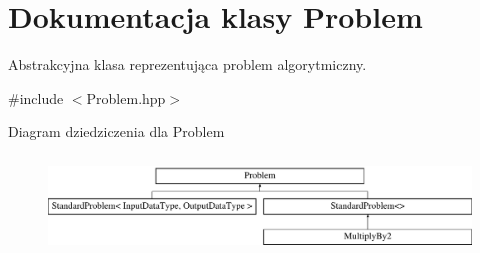 \hypertarget{class_problem}{\section{Dokumentacja klasy Problem}
\label{class_problem}
}


Abstrakcyjna klasa reprezentująca problem algorytmiczny.  




{\ttfamily \#include $<$Problem.\-hpp$>$}

Diagram dziedziczenia dla Problem\begin{figure}[H]
\begin{center}
\leavevmode
\includegraphics[height=2.608696cm]{class_problem}
\end{center}
\end{figure}
